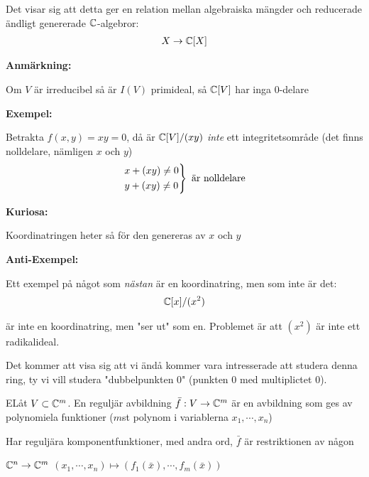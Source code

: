 \noindent Det visar sig att detta ger en relation mellan algebraiska mängder och reducerade ändligt genererade $\mathbb{C}$-algebror:
\begin{equation*}
  \begin{gathered}
    X\to\mathbb{C}[X]
  \end{gathered}
\end{equation*}
\par\bigskip
\noindent\textbf{Anmärkning:}\par
\noindent Om $V$ är irreducibel så är $I(V)$ primideal, så $\mathbb{C}[V]$ har inga 0-delare
\par\bigskip
\noindent\textbf{Exempel:}\par
\noindent Betrakta $f(x,y)=xy=0$, då är $\mathbb{C}[V]/(xy)$ \textit{inte} ett integritetsområde (det finns nolldelare, nämligen $x$ och $y$)
\begin{equation*}
  \begin{gathered}
    \begin{rcases}
      x+(xy)\neq0\\
      y+(xy)\neq0
    \end{rcases}\text{ är nolldelare}
  \end{gathered}
\end{equation*}
\par\bigskip
\noindent\textbf{Kuriosa:}\par
\noindent Koordinatringen heter så för den genereras av $x$ och $y$
\par\bigskip
\noindent\textbf{Anti-Exempel:}\par
\noindent Ett exempel på något som \textit{nästan} är en koordinatring, men som inte är det:
\begin{equation*}
  \begin{gathered}
    \mathbb{C}[x]/(x^2)
  \end{gathered}
\end{equation*}\par
\noindent är inte en koordinatring, men "ser ut" som en. Problemet är att $(x^2)$ är inte ett radikalideal.\par
\noindent Det kommer att visa sig att vi ändå kommer vara intresserade att studera denna ring, ty vi vill studera "dubbelpunkten 0" (punkten 0 med multiplictet 0).
\par\bigskip
\begin{theo}
  ELåt $V\subset\mathbb{C}^m$. En reguljär avbildning $\bar{f}:V\to\mathbb{C}^m$ är en avbildning som ges av polynomiela funktioner ($m$st polynom i variablerna $x_1,\cdots,x_n$)
  \par\bigskip
  \noindent Har reguljära komponentfunktioner, med andra ord, $\bar{f}$ är restriktionen av någon\par
  $\mathbb{C}^n\to\mathbb{C}^m$ $(x_1,\cdots,x_n)\mapsto(f_1(\bar{x}),\cdots,f_m(\bar{x}))$
\end{theo}
